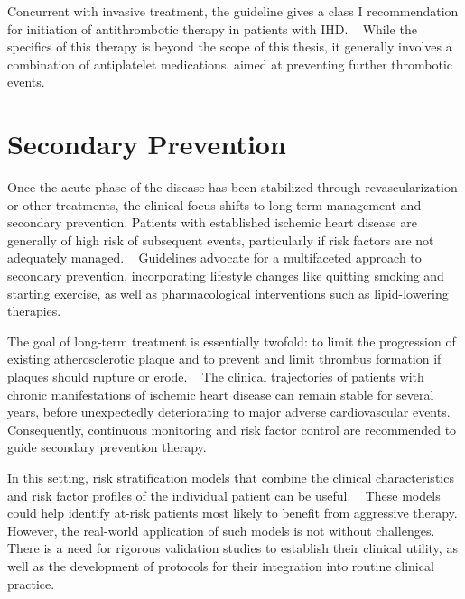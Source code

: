 Concurrent with invasive treatment, 
the guideline gives a class I recommendation for initiation 
of antithrombotic therapy in patients with \ac{IHD}. 
~\autocite{byrne20232023}
While the specifics of this therapy is beyond the scope of this thesis,
it generally involves a combination of antiplatelet medications, 
aimed at preventing further thrombotic events.
~\autocite{nabelTale2012}

\section{Secondary Prevention}


Once the acute phase of the disease has been stabilized 
through revascularization or other treatments,
the clinical focus shifts to long-term management and secondary prevention.
Patients with established ischemic heart disease are generally of 
high risk of subsequent events, 
particularly if risk factors are not adequately managed.
~\autocite{clarkMetaAnalysis2005}
Guidelines advocate for a multifaceted approach to secondary prevention, 
incorporating lifestyle changes like quitting smoking and starting exercise, 
as well as pharmacological interventions such as lipid-lowering therapies. 
~\autocite{visseren20212021}

The goal of long-term treatment is essentially twofold:
to limit the progression of existing atherosclerotic plaque and 
to prevent and limit thrombus formation if plaques should rupture or erode.
~\autocite{foxMyth2020}
The clinical trajectories of patients with chronic manifestations of 
ischemic heart disease can remain stable for several years,
before unexpectedly deteriorating to 
major adverse cardiovascular events.
~\autocite{foxMyth2020}
Consequently, continuous monitoring and risk factor control 
are recommended to guide secondary prevention therapy.

In this setting,
risk stratification models that combine the clinical characteristics 
and risk factor profiles of the individual patient can be useful.
~\autocite{visseren20212021}
These models could help identify at-risk patients most likely to benefit from 
aggressive therapy. 
However, the real-world application of such models is not without challenges.
There is a need for rigorous validation studies to establish their 
clinical utility, as well as the development of 
protocols for their integration into routine clinical practice.

